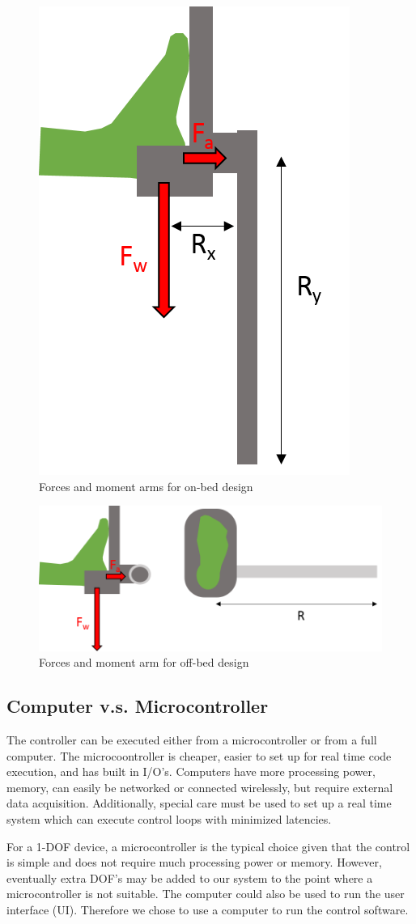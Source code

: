 \documentclass[12pt]{report}
\begin{document}
	\begin{figure}[h] 
		\centering
		\includegraphics[width=0.3\linewidth]{on-bed_moment}
		\caption{Forces and moment arms for on-bed design}
		\label{fig:on-bed_moment}
	\end{figure}
	
	
	\begin{figure}[h] 
		\centering
		\includegraphics[width=0.6\linewidth]{off-bed_moment}
		\caption{Forces and moment arm for off-bed design}
		\label{fig:off-bed_moment}
	\end{figure}
	
	
	\subsection{Computer v.s. Microcontroller}
	
	The controller can be executed either from a microcontroller or from a full computer. The microcoontroller is cheaper, easier to set up for real time code execution, and has built in I/O's. Computers have more processing power, memory, can easily be networked or connected wirelessly, but require external data acquisition. Additionally, special care must be used to set up a real time system which can execute control loops with minimized latencies. 
	
	For a 1-DOF device, a microcontroller is the typical choice given that the control is simple and does not require much processing power or memory. However, eventually extra DOF's may be added to our system to the point where a microcontroller is not suitable. The computer could also be used to run the user interface (UI). Therefore we chose to use a computer to run the control software. 
\end{document}
